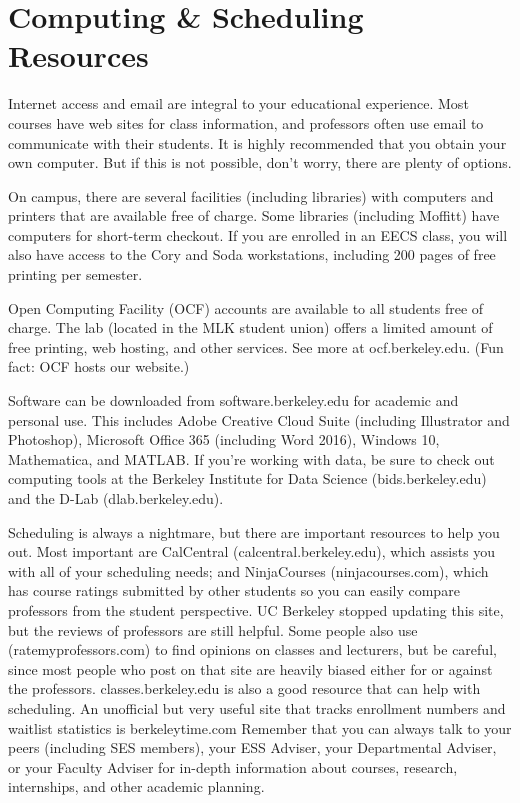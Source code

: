\chapter*{Computing \& Scheduling Resources}

Internet access and email are integral to your educational experience. Most courses have web sites for class information, and professors often use email to communicate with their students. It is highly recommended that you obtain your own computer. But if this is not possible, don’t worry, there are plenty of options.

On campus, there are several facilities (including libraries) with computers and printers that are available free of charge. Some libraries (including Moffitt) have computers for short-term checkout. If you are enrolled in an EECS class, you will also have access to the Cory and Soda workstations, including 200 pages of free printing per semester.

Open Computing Facility (OCF) accounts are available to all students free of charge. The lab (located in the MLK student union) offers a limited amount of free printing, web hosting, and other services. See more at {\selectfont ocf.berkeley.edu}. (Fun fact: OCF hosts our website.)

Software can be downloaded from {\selectfont software.berkeley.edu} for academic and personal use. This includes Adobe Creative Cloud Suite (including Illustrator and Photoshop), Microsoft Office 365 (including Word 2016), Windows 10, Mathematica, and MATLAB. If you’re working with data, be sure to check out computing tools at the Berkeley Institute for Data Science ({\selectfont bids.berkeley.edu}) and the D-Lab ({\selectfont dlab.berkeley.edu}).

Scheduling is always a nightmare, but there are important resources to help you out. Most important are CalCentral ({\selectfont calcentral.berkeley.edu}), which assists you with all of your scheduling needs; and NinjaCourses ({\selectfont ninjacourses.com}), which has course ratings submitted by other students so you can easily compare professors from the student perspective. UC Berkeley stopped updating this site, but the reviews of professors are still helpful.  Some people also use ({\selectfont ratemyprofessors.com}) to find opinions on classes and lecturers, but be careful, since most people who post on that site are heavily biased either for or against the professors.
{\selectfont classes.berkeley.edu} is also a good resource that can help with scheduling. An unofficial but very useful site that tracks enrollment numbers and waitlist statistics is { \selectfont berkeleytime.com}
Remember that you can always talk to your peers (including SES members), your ESS Adviser, your Departmental Adviser, or your Faculty Adviser for in-depth information about courses, research, internships, and other academic planning.


